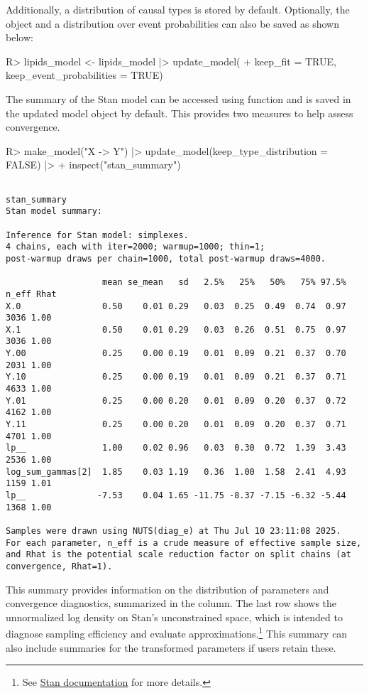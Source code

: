 \documentclass[
  11pt,
  article]{jss}
\renewcommand{\texttt}[1]{\code{#1}}
\begin{document}
Additionally, a distribution of causal types is stored by default.
Optionally, the \texttt{stanfit} object and a distribution over event
probabilities can also be saved as shown below:

\begin{CodeInput}
R> lipids_model <- lipids_model |> update_model(
+    keep_fit = TRUE, keep_event_probabilities = TRUE)
\end{CodeInput}

The summary of the Stan model can be accessed using \texttt{inspect()}
function and is saved in the updated model object by default. This
provides two measures to help assess convergence.

\begin{CodeInput}
R> make_model("X -> Y") |> update_model(keep_type_distribution = FALSE) |>
+    inspect("stan_summary") 
\end{CodeInput}

\begin{verbatim}

stan_summary
Stan model summary:

Inference for Stan model: simplexes.
4 chains, each with iter=2000; warmup=1000; thin=1; 
post-warmup draws per chain=1000, total post-warmup draws=4000.

                   mean se_mean   sd   2.5%   25%   50%   75% 97.5% n_eff Rhat
X.0                0.50    0.01 0.29   0.03  0.25  0.49  0.74  0.97  3036 1.00
X.1                0.50    0.01 0.29   0.03  0.26  0.51  0.75  0.97  3036 1.00
Y.00               0.25    0.00 0.19   0.01  0.09  0.21  0.37  0.70  2031 1.00
Y.10               0.25    0.00 0.19   0.01  0.09  0.21  0.37  0.71  4633 1.00
Y.01               0.25    0.00 0.20   0.01  0.09  0.20  0.37  0.72  4162 1.00
Y.11               0.25    0.00 0.20   0.01  0.09  0.20  0.37  0.71  4701 1.00
lp__               1.00    0.02 0.96   0.03  0.30  0.72  1.39  3.43  2536 1.00
log_sum_gammas[2]  1.85    0.03 1.19   0.36  1.00  1.58  2.41  4.93  1159 1.01
lp__              -7.53    0.04 1.65 -11.75 -8.37 -7.15 -6.32 -5.44  1368 1.00

Samples were drawn using NUTS(diag_e) at Thu Jul 10 23:11:08 2025.
For each parameter, n_eff is a crude measure of effective sample size,
and Rhat is the potential scale reduction factor on split chains (at 
convergence, Rhat=1).
\end{verbatim}

This summary provides information on the distribution of parameters and
convergence diagnostics, summarized in the \texttt{Rhat} column. The
last row shows the unnormalized log density on Stan's unconstrained
space, which is intended to diagnose sampling efficiency and evaluate
approximations.\footnote{See
  \href{https://mc-stan.org/cmdstanr/reference/fit-method-lp.html}{Stan
  documentation} for more details.} This summary can also include
summaries for the transformed parameters if users retain these.
\end{document}
